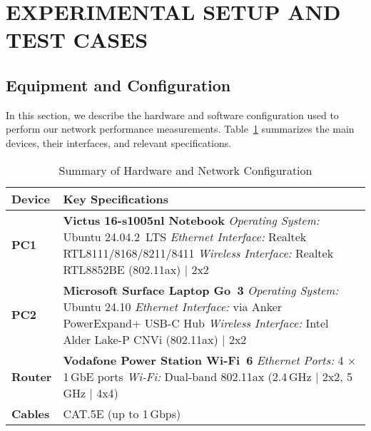 
\section{EXPERIMENTAL SETUP AND TEST CASES} \label{sec:experimental-setup-and-test-cases}


    \subsection{Equipment and Configuration} \label{subsec:equipment-and-configuration}

        In this section, we describe the hardware and software configuration used to perform our network performance measurements. 
        Table~\ref{tab:equipment-summary} summarizes the main devices, their interfaces, and relevant specifications. 

        \begin{table}[ht]
            \small
            \centering
            \begin{tabular}{@{}l p{}@{}}
            \toprule
            \textbf{Device} & \textbf{Key Specifications} \\
            \midrule
            \textbf{PC1} 
                & \textbf{Victus 16-s1005nl Notebook} \newline
                \textit{Operating System:}   Ubuntu 24.04.2~LTS \newline
                \textit{Ethernet Interface:} Realtek RTL8111/8168/8211/8411 \newline
                \textit{Wireless Interface:} Realtek RTL8852BE (802.11ax) | 2x2 \\
            \midrule
            \textbf{PC2} 
                & \textbf{Microsoft Surface Laptop Go~3} \newline
                \textit{Operating System:}   Ubuntu 24.10 \newline
                \textit{Ethernet Interface:} via Anker PowerExpand+ USB-C Hub \newline
                \textit{Wireless Interface:} Intel Alder Lake-P CNVi (802.11ax) | 2x2 \\
            \midrule
            \textbf{Router} 
                & \textbf{Vodafone Power Station Wi-Fi~6} \newline
                \textit{Ethernet Ports:}     4 $\times$ 1\,GbE ports \newline
                \textit{Wi-Fi:}              Dual-band 802.11ax (2.4\,GHz | 2x2, 5\,GHz | 4x4) \\
            \midrule
            \textbf{Cables} 
                & CAT.5E (up to 1\,Gbps) \\
            \bottomrule
            \end{tabular}
            \vspace{0.5cm}
            \caption{Summary of Hardware and Network Configuration}
            \label{tab:equipment-summary}
        \end{table}

